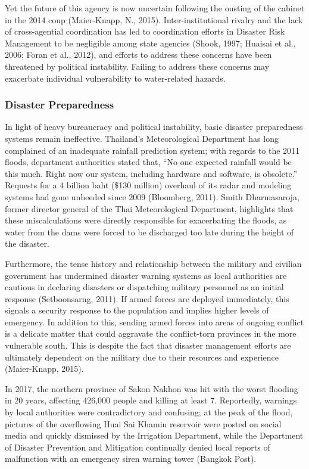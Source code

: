 Yet the future of this agency is now uncertain following the ousting of the cabinet in the 2014 coup (Maier-Knapp, N., 2015). Inter-institutional rivalry and the lack of cross-agential coordination has led to coordination efforts in Disaster Risk Management to be negligible among state agencies (Shook, 1997; Huaisai et al., 2006; Foran et al., 2012), and efforts to address these concerns have been threatened by political instability. Failing to address these concerns may exacerbate individual vulnerability to water-related hazards.

\subsubsection{Disaster Preparedness} 

In light of heavy bureaucracy and political instability, basic disaster preparedness systems remain ineffective. Thailand’s Meteorological Department has long complained of an inadequate rainfall prediction system; with regards to the 2011 floods, department authorities stated that, “No one expected rainfall would be this much. Right now our system, including hardware and software, is obsolete.” Requests for a 4 billion baht (\$130 million) overhaul of its radar and modeling systems had gone unheeded since 2009 (Bloomberg, 2011). Smith Dharmasaroja, former director general of the Thai Meteorological Department, highlights that these miscalculations were directly responsible for exacerbating the floods, as water from the dams were forced to be discharged too late during the height of the disaster.

Furthermore, the tense history and relationship between the military and civilian government has undermined disaster warning systems as local authorities are cautious in declaring disasters or dispatching military personnel as an initial response (Setboonsarng, 2011). If armed forces are deployed immediately, this signals a security response to the population and implies higher levels of emergency. In addition to this, sending armed forces into areas of ongoing conflict is a delicate matter that could aggravate the conflict-torn provinces in the more vulnerable south. This is despite the fact that disaster management efforts are ultimately dependent on the military due to their resources and experience (Maier-Knapp, 2015). 

In 2017, the northern province of Sakon Nakhon was hit with the worst flooding in 20 years, affecting 426,000 people and killing at least 7. Reportedly, warnings by local authorities were contradictory and confusing; at the peak of the flood, pictures of the overflowing Huai Sai Khamin reservoir were posted on social media and quickly dismissed by the Irrigation Department, while the Department of Disaster Prevention and Mitigation continually denied local reports of malfunction with an emergency siren warning tower (Bangkok Post). 

